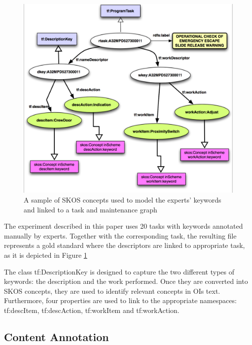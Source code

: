 \documentclass[runningheads,a4paper]{{llncs}}
\begin{document}


\begin{figure}[!htb]
\centering
\includegraphics[scale=0.6]{img/descriptors_oi.png}
\caption{A sample of SKOS concepts used to model the experts' keywords  and linked to a task and maintenance graph}
\label{figdescriptors}
\end{figure}

The experiment described in this paper uses 20 tasks with keywords annotated manually by experts. Together with the corresponding task, the resulting file represents a gold standard where the descriptors are linked to appropriate task, as it is depicted in Figure \ref{figdescriptors}


The class \textsf{tf:DescriptionKey} is designed to capture the two different types of keywords: the description and the work performed. Once they are converted into SKOS concepts, they are used to identify relevant concepts in OIs text. Furthermore, four properties are used to link to the appropriate namespaces: \textsf{tf:descItem}, \textsf{tf:descAction}, \textsf{tf:workItem} and \textsf{tf:workAction}.


\subsection{Content Annotation}
\label{sec:contentannot}
\end{document}
